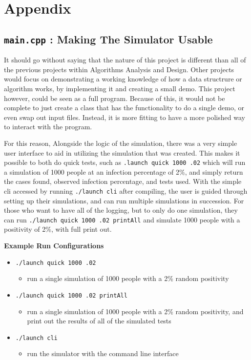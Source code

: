 \documentclass[letterpaper, 10pt]{article}
\begin{document}
\section{Appendix}

\subsection{\texttt{main.cpp} : Making The Simulator Usable}

It should go without saying that the nature of this project is different than all of the previous projects within Algorithms Analysis and Design. Other projects would focus on demonstrating a working knowledge of how a data structrure or algorithm works, by implementing it and creating a small demo. This project however, could be seen as a full program. Because of this, it would not be complete to just create a class that has the functionality to do a single demo, or even swap out input files. Instead, it is more fitting to have a more polished way to interact with the program.

For this reason, Alongside the logic of the simulation, there was  a very simple user interface to aid in utilizing the simulation that was created. This makes it possible to both do quick tests, such as \texttt{.launch quick 1000 .02} which will run a simulation of 1000 people at an infection percentage of 2\%, and simply return the cases found, observed infection percentage,  and tests used. With the simple cli accessed by running \texttt{./launch cli} after compiling, the user is guided through setting up their simulations, and can run multiple simulations in succession. For those who want to have all of the logging, but to only do one simulation, they can run \texttt{./launch quick 1000 .02 printAll} and simulate 1000 people with a positivity of 2\%, with full print out.


\textbf{Example Run Configurations}
\begin{itemize}
    \item \texttt{./launch quick 1000 .02} 
    \begin{itemize}
        \item run a single simulation of 1000 people with a 2\% random positivity
    \end{itemize}
    \item \texttt{./launch quick 1000 .02 printAll} 
     \begin{itemize}
        \item run a single simulation of 1000 people with a 2\% random positivity, and print out the results of all of the simulated tests
    \end{itemize}
    \item \texttt{./launch cli}
    \begin{itemize}
        \item run the simulator with the command line interface
    \end{itemize}
\end{itemize}
\end{document}
